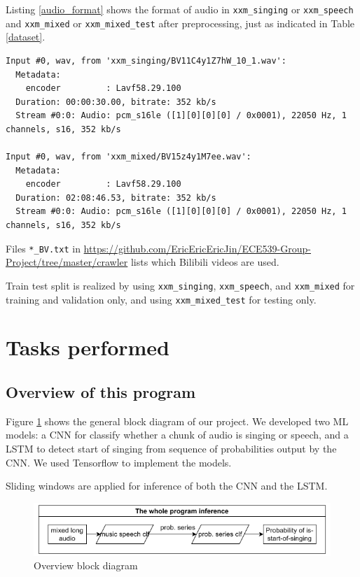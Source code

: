 \documentclass{article}
\begin{document}
    
    Listing \ref{audio_format} shows the format of audio in \lstinline|xxm_singing| or \lstinline|xxm_speech| and \lstinline|xxm_mixed| or \lstinline|xxm_mixed_test| after preprocessing, just as indicated in Table \ref{dataset}. 
\begin{lstlisting}[caption={Preprocessed data format}, label={audio_format}]
Input #0, wav, from 'xxm_singing/BV11C4y1Z7hW_10_1.wav':
  Metadata:
    encoder         : Lavf58.29.100
  Duration: 00:00:30.00, bitrate: 352 kb/s
  Stream #0:0: Audio: pcm_s16le ([1][0][0][0] / 0x0001), 22050 Hz, 1 channels, s16, 352 kb/s

Input #0, wav, from 'xxm_mixed/BV15z4y1M7ee.wav':
  Metadata:
    encoder         : Lavf58.29.100
  Duration: 02:08:46.53, bitrate: 352 kb/s
  Stream #0:0: Audio: pcm_s16le ([1][0][0][0] / 0x0001), 22050 Hz, 1 channels, s16, 352 kb/s
\end{lstlisting}

    Files \lstinline|*_BV.txt| in \url{https://github.com/EricEricEricJin/ECE539-Group-Project/tree/master/crawler} lists which Bilibili videos are used.

    Train test split is realized by using \lstinline|xxm_singing|, \lstinline|xxm_speech|, and \lstinline|xxm_mixed| for training and validation only, and using \lstinline|xxm_mixed_test| for testing only. 

    \section{Tasks performed}
    \subsection{Overview of this program}
    Figure \ref{overview_bd} shows the general block diagram of our project. We developed two ML models: a CNN for classify whether a chunk of audio is singing or speech, and a LSTM to detect start of singing from sequence of probabilities output by the CNN. We used Tensorflow to implement the models.
    
    Sliding windows are applied for inference of both the CNN and the LSTM.
    \begin{figure}[H]
        \centering
        \includegraphics[width=0.8\linewidth]{figures/overview_bd.png}
        \caption{Overview block diagram}
        \label{overview_bd}
    \end{figure}
\end{document}
